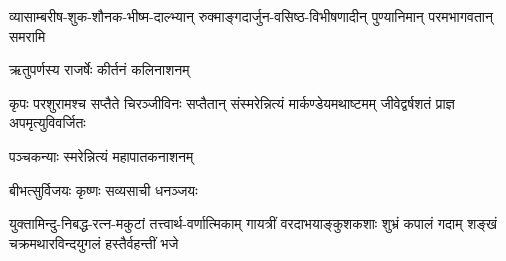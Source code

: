 \Large
\sectionmark{\mbox{}}
\begin{center}


{व्यासाम्बरीष-शुक-शौनक-भीष्म-दाल्भ्यान्}
{रुक्माङ्गदार्जुन-वसिष्ठ-विभीषणादीन्}
{पुण्यानिमान् परमभागवतान् समरामि}


{ऋतुपर्णस्य राजर्षेः कीर्तनं कलिनाशनम्}

{कृपः परशुरामश्च सप्तैते चिरञ्जीविनः}
{सप्तैतान् संस्मरेन्नित्यं मार्कण्डेयमथाष्टमम्}
{जीवेद्वर्षशतं प्राज्ञ अपमृत्युविवर्जितः}

{पञ्चकन्याः स्मरेन्नित्यं महापातकनाशनम्}


{बीभत्सुर्विजयः कृष्णः सव्यसाची धनञ्जयः}

{युक्तामिन्दु-निबद्ध-रत्न-मकुटां तत्त्वार्थ-वर्णात्मिकाम्}
{गायत्रीं वरदाभयाङ्कुशकशाः शुभ्रं कपालं गदाम्}
{शङ्खं चक्रमथारविन्दयुगलं हस्तैर्वहन्तीं भजे}








\end{center}
